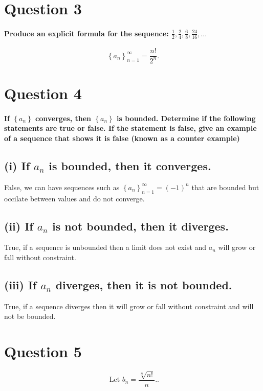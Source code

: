 \section*{Question 3}%
\label{sec:Question 3}

\paragraph{Produce an explicit formula for the sequence: $ \frac{1}{2},\frac{2}{4},\frac{6}{8},\frac{24}{16},\ldots $}

\[
\left\{ a_n \right\} _{ n=1 }^{ \infty }=\frac{ n! }{ 2^{ n } }
.\] 

\section*{Question 4}%
\paragraph{If $ \left\{ a_n \right\}  $ converges, then $ \left\{ a_n \right\}  $ is bounded. Determine if the following statements are true or false. If the statement is false, give an example of a sequence that shows it is false (known as a counter example)}


\subsection*{(i) If $ a_n $ is bounded, then it converges.}%
False, we can have sequences such as $ \left\{ a_n \right\} _{ n=1 }^{ \infty }=\left( -1 \right) ^{ n } $ that are bounded but occilate between values and do not converge. 
\subsection*{(ii) If $ a_n $ is not bounded, then it diverges.}%
True, if a sequence is unbounded then a limit does not exist and $ a_n $ will grow or fall without constraint. 
\subsection*{(iii) If $ a_n $ diverges, then it is not bounded.}%
True, if a sequence diverges then it will grow or fall without constraint and will not be bounded.

\section*{Question 5}%
\[
\text{ Let }b_n = \frac{ \sqrt[ n ]{ n! }  }{ n }. 
.\] 
